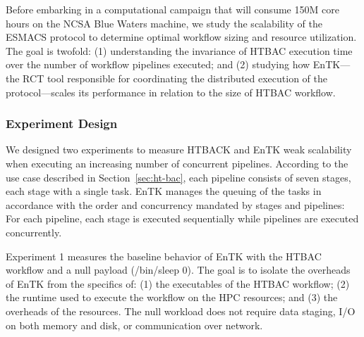 
Before embarking in a computational campaign that will consume 150M core
hours on the NCSA Blue Waters machine, we study the scalability of the ESMACS
protocol to determine optimal workflow sizing and resource utilization. The
goal is twofold: (1) understanding the invariance of HTBAC execution time
over the number of workflow pipelines executed; and (2) studying how
EnTK---the RCT tool responsible for coordinating the distributed execution of
the protocol---scales its performance in relation to the size of HTBAC
workflow.

\subsubsection{Experiment Design}

We designed two experiments to measure HTBACK and EnTK weak scalability when
executing an increasing number of concurrent pipelines. According to the use
case described in Section~\ref{sec:ht-bac}, each pipeline consists of seven
stages, each stage with a single task. EnTK manages the queuing of the tasks
in accordance with the order and concurrency mandated by stages and
pipelines: For each pipeline, each stage is executed sequentially while
pipelines are executed concurrently.


Experiment 1 measures the baseline behavior of EnTK with the HTBAC workflow
and a null payload (\textmd{/bin/sleep 0}). The goal is to isolate the
overheads of EnTK from the specifics of: (1) the executables of the HTBAC
workflow; (2) the runtime used to execute the workflow on the HPC resources;
and (3) the overheads of the resources. The null workload does not require
data staging, I/O on both memory and disk, or communication over network.

